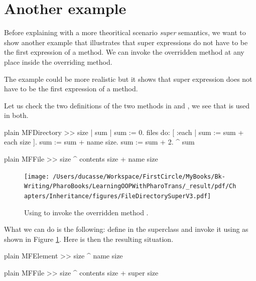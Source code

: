 \documentclass[10pt,twoside,english]{_support/latex/sbabook/sbabook}
\begin{document}
\section{Another example}
Before explaining with a more theoritical scenario \textit{super} semantics, we want to show another example that illustrates that super expressions do not have to be the first expression of a method. We can invoke the overridden method at any place inside the overriding method.

The example could be more realistic but it shows that super expression does not have to be the first expression of a method.

Let us check the two definitions of the two methods  in  and , we see that  is used in both.

\begin{displaycode}{plain}
MFDirectory >> size
	| sum |
	sum := 0.
	files do: [ :each | sum := sum + each size ].
	sum := sum + name size.
	sum := sum + 2.
	^ sum
\end{displaycode}

\begin{displaycode}{plain}
MFFile >> size
	^ contents size + name size
\end{displaycode}


\begin{figure}

\begin{center}
\texttt{[image: /Users/ducasse/Workspace/FirstCircle/MyBooks/Bk-Writing/PharoBooks/LearningOOPWithPharoTrans/\_result/pdf/Chapters/Inheritance/figures/FileDirectorySuperV3.pdf]}\caption{Using  to invoke the overridden method .\label{fig:FileDirectorySuperV3}}\end{center}
\end{figure}


What we can do is the following: define  in the superclass and invoke it using  as shown in Figure \ref{fig:FileDirectorySuperV3}. Here is then the resulting situation.

\begin{displaycode}{plain}
MFElement >> size
	^ name size
\end{displaycode}

\begin{displaycode}{plain}
MFFile >> size
	^ contents size + super size
\end{displaycode}
\end{document}
